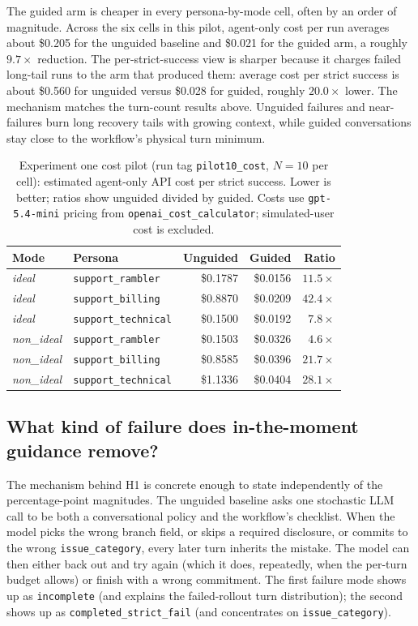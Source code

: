 \documentclass[11pt,a4paper]{article}
\begin{document}
The guided arm is cheaper in every persona-by-mode cell, often by an order of magnitude. Across the six cells in this pilot, agent-only cost per run averages about \$0.205 for the unguided baseline and \$0.021 for the guided arm, a roughly $9.7\times$ reduction. The per-strict-success view is sharper because it charges failed long-tail runs to the arm that produced them: average cost per strict success is about \$0.560 for unguided versus \$0.028 for guided, roughly $20.0\times$ lower. The mechanism matches the turn-count results above. Unguided failures and near-failures burn long recovery tails with growing context, while guided conversations stay close to the workflow's physical turn minimum.

\begin{table}[htbp]
  \centering
  \small
  \caption{Experiment one cost pilot (run tag \texttt{pilot10\_cost}, $N=10$ per cell): estimated agent-only API cost per strict success. Lower is better; ratios show unguided divided by guided. Costs use \texttt{gpt-5.4-mini} pricing from \texttt{openai\_cost\_calculator}; simulated-user cost is excluded.}
  \label{tab:exp1-cost-pilot}
  \begin{tabular}{llrrr}
    \toprule
    Mode & Persona & Unguided & Guided & Ratio \\
    \midrule
    \emph{ideal}      & \texttt{support\_rambler}   & \$0.1787 & \$0.0156 & $11.5\times$ \\
    \emph{ideal}      & \texttt{support\_billing}   & \$0.8870 & \$0.0209 & $42.4\times$ \\
    \emph{ideal}      & \texttt{support\_technical} & \$0.1500 & \$0.0192 &  $7.8\times$ \\
    \emph{non\_ideal} & \texttt{support\_rambler}   & \$0.1503 & \$0.0326 &  $4.6\times$ \\
    \emph{non\_ideal} & \texttt{support\_billing}   & \$0.8585 & \$0.0396 & $21.7\times$ \\
    \emph{non\_ideal} & \texttt{support\_technical} & \$1.1336 & \$0.0404 & $28.1\times$ \\
    \bottomrule
  \end{tabular}
\end{table}

\subsection{What kind of failure does in-the-moment guidance remove?}

The mechanism behind H1 is concrete enough to state independently of the percentage-point magnitudes. The unguided baseline asks one stochastic LLM call to be both a conversational policy and the workflow's checklist. When the model picks the wrong branch field, or skips a required disclosure, or commits to the wrong \texttt{issue\_category}, every later turn inherits the mistake. The model can then either back out and try again (which it does, repeatedly, when the per-turn budget allows) or finish with a wrong commitment. The first failure mode shows up as \texttt{incomplete} (and explains the failed-rollout turn distribution); the second shows up as \texttt{completed\_strict\_fail} (and concentrates on \texttt{issue\_category}).
\end{document}
